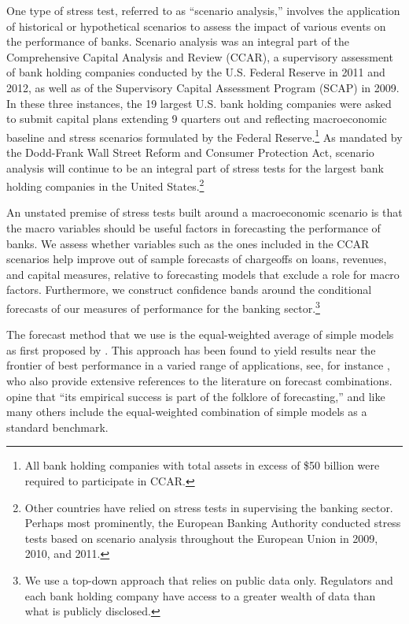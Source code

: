\documentclass[12pt]{article}
\begin{document}
One type of stress test, referred to as ``scenario analysis,''
involves the application of historical or hypothetical scenarios
to assess the impact of various events on the performance of
banks. Scenario analysis was an integral part of the Comprehensive
Capital Analysis and Review (CCAR), a supervisory assessment of
bank holding companies conducted by the U.S. Federal Reserve in
2011 and 2012, as well as of the Supervisory Capital Assessment
Program (SCAP) in 2009. In these three instances, the 19 largest
U.S. bank holding companies were asked to submit capital plans
extending 9 quarters out and reflecting macroeconomic baseline and
stress scenarios formulated by the Federal Reserve.\footnote{All
bank holding companies with total assets in excess of \$50 billion
were required to participate in CCAR.} As mandated by the
Dodd-Frank Wall Street Reform and Consumer Protection Act,
scenario analysis will continue to be an integral part of stress
tests for the largest bank holding companies in the United
States.\footnote{Other countries have relied on stress tests in
supervising the banking sector. Perhaps most prominently, the
European Banking Authority conducted stress tests based on
scenario analysis throughout the European Union in 2009, 2010, and
2011.}

An unstated premise of stress tests built around a macroeconomic
scenario is that the macro variables should be useful factors in
forecasting the performance of banks. We assess whether variables
such as the ones included in the CCAR scenarios help improve out
of sample forecasts of chargeoffs on loans, revenues, and capital
measures, relative to forecasting models that exclude a role for
macro factors. Furthermore, we construct confidence bands around
the conditional forecasts of our measures of performance for the
banking sector.\footnote{We use a top-down approach that relies on
public data only. Regulators and each bank holding company have
access to a greater wealth of data than what is publicly
disclosed.}

The forecast method that we use is the equal-weighted average of
simple models as first proposed by . This
approach has been found to yield results near the frontier of best
performance in a varied range of applications, see, for instance
, who also provide extensive references to the
literature on forecast combinations.  opine that
``its empirical success is part of the folklore of forecasting,''
and like many others include the equal-weighted combination of
simple models as a standard benchmark.
\end{document}
